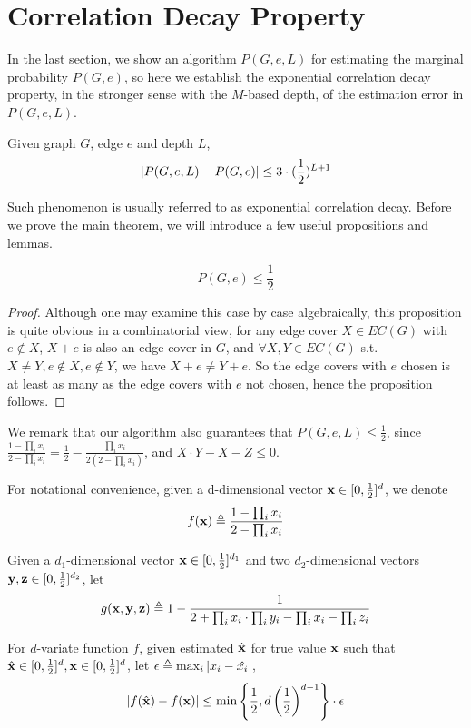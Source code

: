 \section{Correlation Decay Property}

In the last section, we show an algorithm $P(G,e,L)$ for estimating the marginal probability $P(G,e)$,
so here we establish the exponential correlation decay property, in the stronger sense with the
$M$-based depth,
of the estimation error in $P(G,e,L)$.%

\begin{Thm}
	\label{cd-main-theorem}
	Given graph $G$, edge $e$ and depth $L$,
	\[\left\vert P(G,e,L) - P(G,e)\right\vert \leq 3\cdot(\frac{1}{2})^{L+1}\]
\end{Thm}

Such phenomenon is usually referred to as exponential correlation decay. Before we prove the main theorem, we will introduce a few useful propositions and lemmas.

\begin{Prop}
	\[P(G, e) \leq \frac{1}{2}\]
\end{Prop}

\begin{proof}
	Although one may examine this case by case algebraically, this proposition is quite obvious in a combinatorial view, for any edge cover $X \in EC(G)$ with $e \notin X$, $X+e$ is also an edge cover in $G$, and $\forall X,Y \in EC(G)$ s.t. $X \neq Y, e \notin X, e\notin Y$, we have $X+e \neq Y+e$. So the edge covers with $e$ chosen is at least as many as the edge covers with $e$ not chosen, hence the proposition follows.
\end{proof}

We remark that our algorithm also guarantees that $P(G,e,L) \leq \frac{1}{2}$,
since $\frac{1 - \prod_i x_i}{2 - \prod_i x_i} = \frac{1}{2} - \frac{\prod_i x_i}{2(2 - \prod_i x_i)}$, and $X\cdot Y - X - Z \leq 0$.

For notational convenience, given a d-dimensional vector ${\bf x} \in [0, \frac{1}{2}]^d$, we denote
\[ f({\bf x}) \triangleq \frac{1- \prod_i x_i}{2 - \prod_i x_i}\]

Given a $d_1$-dimensional vector ${\bf x} \in [0, \frac{1}{2}]^{d_1}$ and two $d_2$-dimensional vectors ${\bf y,z} \in [0, \frac{1}{2}]^{d_2}$, let
\[ g({\bf x,y,z}) \triangleq  1- \frac{1}{2+\prod_i x_i \cdot \prod_i y_i - \prod_i x_i - \prod_i z_i} \]


	\begin{Lem}
		\label{meanvalue1}
		For $d$-variate function $f$, given estimated $\hat{\bf x}$ for true value ${\bf x}$ such that $\hat{\bf x} \in  [0, \frac{1}{2}]^d, {\bf x} \in [0, \frac{1}{2}]^d$, let $\epsilon \triangleq \max_i{\left\vert x_i - \hat{x_i}\right\vert}$,
		\begin{align*}
			\left\vert f(\hat{\bf x}) - f({\bf x})\right\vert
		\leq  \min{\left\{\frac{1}{2}, d \left( \frac{1}{2} \right)^{d-1}\right\}} \cdot \epsilon
		\end{align*}
	\end{Lem}

